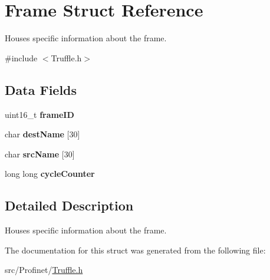 \hypertarget{struct_frame}{}\section{Frame Struct Reference}
\label{struct_frame}


Houses specific information about the frame.  




{\ttfamily \#include $<$Truffle.\+h$>$}

\subsection*{Data Fields}
\begin{DoxyCompactItemize}
\item 
\hypertarget{struct_frame_a3167f81dde5c4ed242144d0e36d3e4b9}{}uint16\+\_\+t {\bfseries frame\+I\+D}\label{struct_frame_a3167f81dde5c4ed242144d0e36d3e4b9}

\item 
\hypertarget{struct_frame_abe6dedff4e4c79805082000e56a7707b}{}char {\bfseries dest\+Name} \mbox{[}30\mbox{]}\label{struct_frame_abe6dedff4e4c79805082000e56a7707b}

\item 
\hypertarget{struct_frame_ae75f7c4ffa15acfdb02104e20cad4ed2}{}char {\bfseries src\+Name} \mbox{[}30\mbox{]}\label{struct_frame_ae75f7c4ffa15acfdb02104e20cad4ed2}

\item 
\hypertarget{struct_frame_a1dc17f9f9d892cec2bcac8027d0bc8cf}{}long long {\bfseries cycle\+Counter}\label{struct_frame_a1dc17f9f9d892cec2bcac8027d0bc8cf}

\end{DoxyCompactItemize}


\subsection{Detailed Description}
Houses specific information about the frame. 

The documentation for this struct was generated from the following file\+:\begin{DoxyCompactItemize}
\item 
src/\+Profinet/\hyperlink{_truffle_8h}{Truffle.\+h}\end{DoxyCompactItemize}

